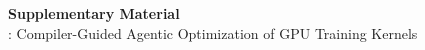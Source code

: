 \documentclass[letterpaper,twocolumn,10pt]{article}
\begin{document}
\onecolumn

\begin{center}
    {\LARGE\bfseries Supplementary Material}\\[6pt]
    {\large \name: Compiler-Guided Agentic Optimization of GPU Training Kernels}
\end{center}

\vspace{1em}

\appendix

\end{document}
